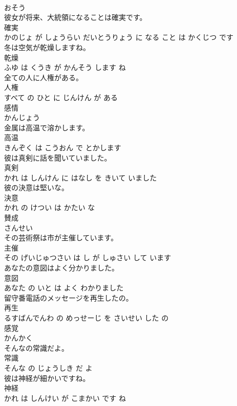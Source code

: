 \documentclass[8pt]{extreport}
\begin{document}
\begin{CJK}{UTF8}{min}
\\	おそう			
\\	彼女が将来、大統領になることは確実です。	
\\	確実 
\\	かのじょ が しょうらい だいとうりょう に なる こと は かくじつ です			
\\	冬は空気が乾燥しますね。	
\\	乾燥 
\\	ふゆ は くうき が かんそう します ね			
\\	全ての人に人権がある。	
\\	人権 
\\	すべて の ひと に じんけん が ある			
\\	感情	
\\	かんじょう			
\\	金属は高温で溶かします。	
\\	高温 
\\	きんぞく は こうおん で とかします			
\\	彼は真剣に話を聞いていました。	
\\	真剣 
\\	かれ は しんけん に はなし を きいて いました			
\\	彼の決意は堅いな。	
\\	決意 
\\	かれ の けつい は かたい な			
\\	賛成	
\\	さんせい			
\\	その芸術祭は市が主催しています。	
\\	主催 
\\	その げいじゅつさい は し が しゅさい して います			
\\	あなたの意図はよく分かりました。	
\\	意図 
\\	あなた の いと は よく わかりました			
\\	留守番電話のメッセージを再生したの。	
\\	再生 
\\	るすばんでんわ の めっせーじ を さいせい した の			
\\	感覚	
\\	かんかく			
\\	そんなの常識だよ。	
\\	常識 
\\	そんな の じょうしき だ よ			
\\	彼は神経が細かいですね。	
\\	神経 
\\	かれ は しんけい が こまかい です ね			

\end{CJK}
\end{document}
